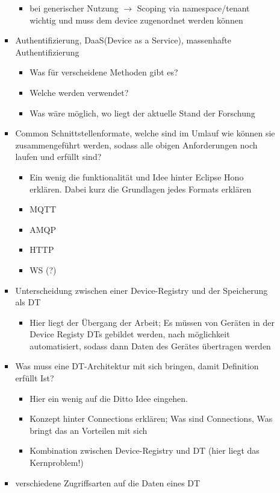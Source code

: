 \documentclass[
	12pt,
	BCOR=5mm,
	DIV=12,
	headinclude=on,
	footinclude=off,
	parskip=half,
	bibliography=totoc,
	listof=entryprefix,
	toc=listof,
	numbers=noenddot,
	plainfootsepline
]{scrreprt}
\begin{document}
\begin{enumerate}
\begin{enumerate}
\begin{itemize}
\begin{itemize}
				\item bei generischer Nutzung $\rightarrow$ Scoping via namespace/tenant wichtig und muss dem device zugenordnet werden können
			\end{itemize}
			\item Authentifizierung, DaaS(Device as a Service), massenhafte Authentifizierung
			\begin{itemize}
				\item Was für verscheidene Methoden gibt es?
				\item Welche werden verwendet?
				\item Was wäre möglich, wo liegt der aktuelle Stand der Forschung
			\end{itemize}
			\item Common Schnittstellenformate, welche sind im Umlauf wie können sie zusammengeführt werden, sodass alle obigen Anforderungen noch laufen und erfüllt sind?
			\begin{itemize}
				\item Ein wenig die funktionalität und Idee hinter Eclipse Hono erklären. Dabei kurz die Grundlagen jedes Formats erklären
				\item MQTT
				\item AMQP
				\item HTTP
				\item WS (?)
			\end{itemize}
			\item Unterscheidung zwischen einer Device-Registry und der Speicherung als DT
			\begin{itemize}
				\item Hier liegt der Übergang der Arbeit; Es müssen von Geräten in der Device Registy DTs gebildet werden, nach möglichkeit automatisiert, sodass dann Daten des Gerätes übertragen werden
			\end{itemize}
			\item Was muss eine DT-Architektur mit sich bringen, damit Definition erfüllt Ist?
			\begin{itemize}
				\item Hier ein wenig auf die Ditto Idee eingehen.
				\item Konzept hinter Connections erklären; Was sind Connections, Was bringt das an Vorteilen mit sich
				\item Kombination zwischen Device-Registry und DT (hier liegt das Kernproblem!)
			\end{itemize}
			\item verschiedene Zugriffsarten auf die Daten eines DT

\end{itemize}
\end{enumerate}
\end{enumerate}
\end{document}
